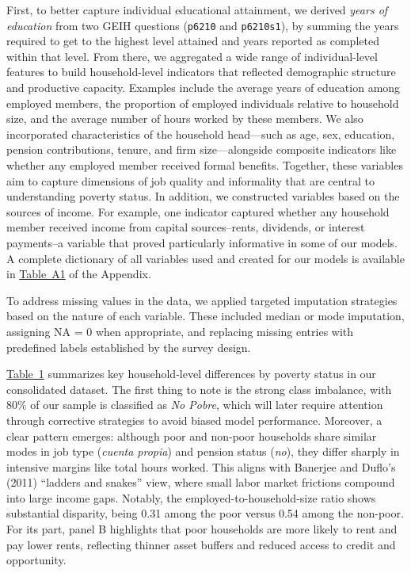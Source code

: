 \documentclass[12pt,a4paper,onecolumn]{article}
\begin{document}
First, to better capture individual educational attainment, we derived \textit{years of education} from two GEIH questions (\texttt{p6210} and \texttt{p6210s1}), by summing the years required to get to the highest level attained and years reported as completed within that level. From there, we aggregated a wide range of individual-level features to build household-level indicators that reflected demographic structure and productive capacity. Examples include the average years of education among employed members, the proportion of employed individuals relative to household size, and the average number of hours worked by these members. We also incorporated characteristics of the household head—such as age, sex, education, pension contributions, tenure, and firm size—alongside composite indicators like whether any employed member received formal benefits. Together, these variables aim to capture dimensions of job quality and informality that are central to understanding poverty status. In addition, we constructed variables based on the sources of income. For example, one indicator captured whether any household member received income from capital sources--rents, dividends, or interest payments--a variable that proved particularly informative in some of our models. A complete dictionary of all variables used and created for our models is available in \hyperref[tab:vars]{Table~A1} of the Appendix. 

To address missing values in the data, we applied targeted imputation strategies based on the nature of each variable. These included median or mode imputation, assigning NA = 0 when appropriate, and replacing missing entries with predefined labels established by the survey design.

\hyperref[tab:table1]{Table~1} summarizes key household-level differences by poverty status in our consolidated dataset. The first thing to note is the strong class imbalance, with 80\% of our sample is classified as \textit{No Pobre}, which will later require attention through corrective strategies to avoid biased model performance. Moreover, a clear pattern emerges: although poor and non-poor households share similar modes in job type (\textit{cuenta propia}) and pension status (\textit{no}), they differ sharply in intensive margins like total hours worked. This aligns with Banerjee and Duflo’s (2011) “ladders and snakes” view, where small labor market frictions compound into large income gaps. Notably, the employed-to-household-size ratio shows substantial disparity, being
0.31 among the poor versus 0.54 among the non-poor. For its part, panel B highlights that poor households are more likely to rent and pay lower rents, reflecting thinner asset buffers and reduced access to credit and opportunity. 
\end{document}
